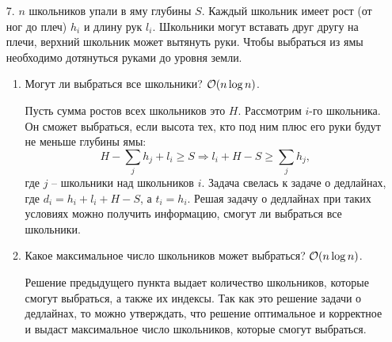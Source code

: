 \begin{enumerate}

  \item[7.]
	$n$ школьников упали в яму глубины $S$. Каждый школьник имеет рост (от ног до плеч) $h_i$
	и длину рук $l_i$. Школьники могут вставать друг другу на плечи, верхний школьник может
	вытянуть руки. Чтобы выбраться из ямы необходимо дотянуться руками до уровня земли.
	\begin{enumerate}
		\item Могут ли выбраться все школьники? $\mathcal{O}(n \log n)$.
		\begin{solution}
      Пусть сумма ростов всех школьников это $H$. Рассмотрим $i$-го школьника. Он сможет выбраться, если высота тех, кто под ним плюс его руки будут не меньше глубины ямы:
      \begin{equation}
        H-\sum_{j}h_j + l_i \ge S \Rightarrow l_i+H-S\ge\sum_{j}h_j,
      \end{equation}
      где $j$ -- школьники над школьников $i$. Задача свелась к задаче о дедлайнах, где $d_i=h_i+l_i+H-S$, а $t_i=h_i$. Решая задачу о дедлайнах при таких условиях можно получить информацию, смогут ли выбраться все школьники.
    \end{solution}
		\item Какое максимальное число школьников может выбраться? $\mathcal{O}(n \log n)$.
		\begin{solution}
      Решение предыдущего пункта выдает количество школьников, которые смогут выбраться, а также их индексы. Так как это решение задачи о дедлайнах, то можно утверждать, что решение оптимальное и корректное и выдаст максимальное число школьников, которые смогут выбраться.
    \end{solution}
	\end{enumerate}



\end{enumerate}
